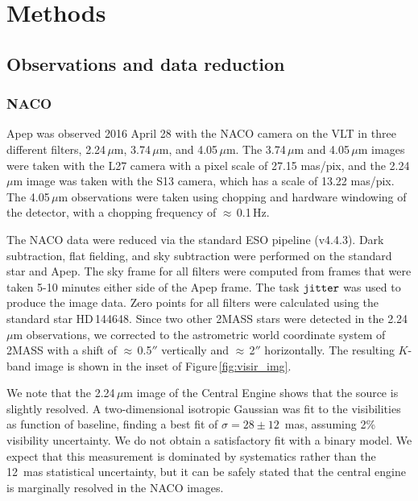 \documentclass[preprint,times]{aastex61}
\begin{document}
\section{Methods}

\subsection{Observations and data reduction}

\subsubsection{NACO}

Apep was observed 2016 April 28 with the NACO camera \citep{2003SPIE.4841..944L,2003SPIE.4839..140R} on the VLT in three different filters, 2.24\,$\mu$m, 3.74\,$\mu$m, and 4.05\,$\mu$m. The 3.74\,$\mu$m and 4.05\,$\mu$m images were taken with the L27 camera with a pixel scale of 27.15 mas/pix, and the 2.24\,$\mu$m image was taken with the S13 camera, which has a scale of 13.22 mas/pix. The 4.05\,$\mu$m observations were taken using chopping and hardware windowing of the detector, with a chopping frequency of $\approx$\,0.1\,Hz. 

The NACO data were reduced via the standard ESO pipeline (v4.4.3). Dark subtraction, flat fielding, and sky subtraction were performed on the standard star and Apep. The sky frame for all filters were computed from frames that were taken 5-10 minutes either side of the Apep frame. The task $\tt{jitter}$ was used to produce the image data. Zero points for all filters were calculated using the standard star HD\,144648. Since two other 2MASS stars were detected in the 2.24\,$\mu$m observations, we corrected to the astrometric world coordinate system of 2MASS with a shift of $\approx$\,0.5$''$ vertically and $\approx$\,2$''$ horizontally. The resulting $K$-band image is shown in the inset of Figure\,\ref{fig:visir_img}.

We note that the 2.24\,$\mu$m image of the Central Engine shows that the source is slightly resolved. A two-dimensional isotropic Gaussian was fit to the visibilities as function of baseline, finding a best fit of $\sigma = 28\pm12$~mas, assuming 2\% visibility uncertainty. We do not obtain a satisfactory fit with a binary model. We expect that this measurement is dominated by systematics rather than the 12~mas statistical uncertainty, but it can be safely stated that the central engine is marginally resolved in the NACO images.
\end{document}
